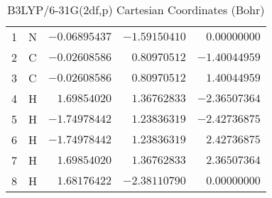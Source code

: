 \documentclass[10pt,oneside]{article}
\begin{document}
\begin{table}[h]
\centering
\caption{B3LYP/6-31G(2df,p) Cartesian Coordinates (Bohr)}
\begin{tabular}{llrrr}
\toprule
1  & N  & $-0.06895437$ & $-1.59150410$ & $ 0.00000000$ \\
2  & C  & $-0.02608586$ & $ 0.80970512$ & $-1.40044959$ \\
3  & C  & $-0.02608586$ & $ 0.80970512$ & $ 1.40044959$ \\
4  & H  & $ 1.69854020$ & $ 1.36762833$ & $-2.36507364$ \\
5  & H  & $-1.74978442$ & $ 1.23836319$ & $-2.42736875$ \\
6  & H  & $-1.74978442$ & $ 1.23836319$ & $ 2.42736875$ \\
7  & H  & $ 1.69854020$ & $ 1.36762833$ & $ 2.36507364$ \\
8  & H  & $ 1.68176422$ & $-2.38110790$ & $ 0.00000000$ \\
\bottomrule
\end{tabular}
\end{table}
\end{document}
